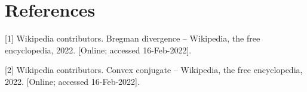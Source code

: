 \documentclass[11pt]{article}
\begin{document}


\section*{References}

[1] Wikipedia contributors. Bregman divergence -- Wikipedia, the free encyclopedia, 2022. [Online; accessed 16-Feb-2022].

[2] Wikipedia contributors. Convex conjugate -- Wikipedia, the free encyclopedia, 2022. [Online; accessed 16-Feb-2022].
{


}
\end{document}
